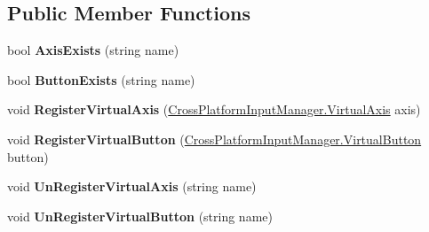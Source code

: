 \subsection*{Public Member Functions}
\begin{DoxyCompactItemize}
\item 
\mbox{\label{class_unity_standard_assets_1_1_cross_platform_input_1_1_virtual_input_ab5744afc94aa095e2f8149bc44920360}} 
bool {\bfseries Axis\+Exists} (string name)
\item 
\mbox{\label{class_unity_standard_assets_1_1_cross_platform_input_1_1_virtual_input_a5d70deed210f91fc144d9a62cab4c535}} 
bool {\bfseries Button\+Exists} (string name)
\item 
\mbox{\label{class_unity_standard_assets_1_1_cross_platform_input_1_1_virtual_input_aa530866e5a5597cee5f56a80b5074914}} 
void {\bfseries Register\+Virtual\+Axis} (\hyperlink{class_unity_standard_assets_1_1_cross_platform_input_1_1_cross_platform_input_manager_1_1_virtual_axis}{Cross\+Platform\+Input\+Manager.\+Virtual\+Axis} axis)
\item 
\mbox{\label{class_unity_standard_assets_1_1_cross_platform_input_1_1_virtual_input_a6073a4d0dc59419c956d3454217f07c3}} 
void {\bfseries Register\+Virtual\+Button} (\hyperlink{class_unity_standard_assets_1_1_cross_platform_input_1_1_cross_platform_input_manager_1_1_virtual_button}{Cross\+Platform\+Input\+Manager.\+Virtual\+Button} button)
\item 
\mbox{\label{class_unity_standard_assets_1_1_cross_platform_input_1_1_virtual_input_a97ed9f03493198eab55eb47e9fa77801}} 
void {\bfseries Un\+Register\+Virtual\+Axis} (string name)
\item 
\mbox{\label{class_unity_standard_assets_1_1_cross_platform_input_1_1_virtual_input_aff127b39add01c4d34a6b5a396d42ea1}} 
void {\bfseries Un\+Register\+Virtual\+Button} (string name)

\end{DoxyCompactItemize}
